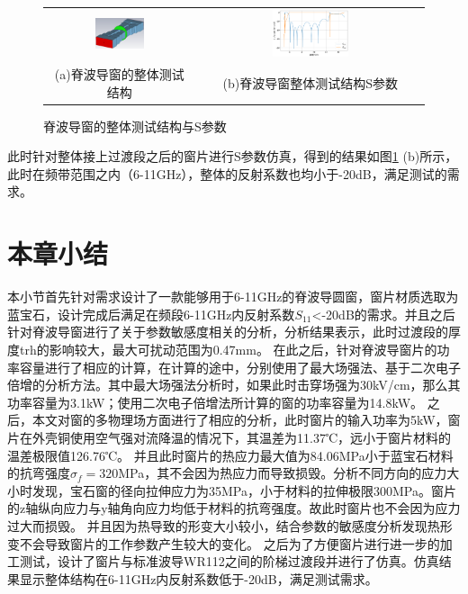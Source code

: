 \documentclass[master]{thesis-uestc}
\begin{document}
\begin{figure}[!htb]
    \small
    \centering
    \begin{tabular}{@{\ }c@{\ }c}
        \includegraphics[width=0.35\textwidth]{pic/chapter3/脊波导窗整体测试结构.png} & 
        \hspace{5pt}
        \includegraphics[width=0.35\textwidth]{pic/chapter3/脊波导窗整体S参数.png}     \\
        \mbox{\small (a)脊波导窗的整体测试结构}                                                                               & 
        \mbox{\small (b)脊波导窗整体测试结构S参数}                                                                                  \\
    \end{tabular}
    \caption{脊波导窗的整体测试结构与S参数}
    \label{fig:脊波导窗的整体测试结构与S参数}
\end{figure}

此时针对整体接上过渡段之后的窗片进行S参数仿真，得到的结果如图\ref{fig:脊波导窗的整体测试结构与S参数} (b)所示，此时在频带范围之内（6-11GHz），整体的反射系数也均小于-20dB，满足测试的需求。


\section{本章小结}
本小节首先针对需求设计了一款能够用于6-11GHz的脊波导圆窗，窗片材质选取为蓝宝石，设计完成后满足在频段6-11GHz内反射系数\(S_{11}\)<-20dB的需求。并且之后针对脊波导窗进行了关于参数敏感度相关的分析，分析结果表示，此时过渡段的厚度trh的影响较大，最大可扰动范围为0.47mm。
在此之后，针对脊波导窗片的功率容量进行了相应的计算，在计算的途中，分别使用了最大场强法、基于二次电子倍增的分析方法。其中最大场强法分析时，如果此时击穿场强为30kV/cm，那么其功率容量为3.1kW；使用二次电子倍增法所计算的窗的功率容量为14.8kW。
之后，本文对窗的多物理场方面进行了相应的分析，此时窗片的输入功率为5kW，窗片在外壳铜使用空气强对流降温的情况下，其温差为11.37℃，远小于窗片材料的温差极限值126.76℃。
并且此时窗片的热应力最大值为84.06MPa小于蓝宝石材料的抗弯强度\(\sigma_f = 320\)MPa，其不会因为热应力而导致损毁。分析不同方向的应力大小时发现，宝石窗的径向拉伸应力为35MPa，小于材料的拉伸极限300MPa。窗片的z轴纵向应力与y轴角向应力均低于材料的抗弯强度。故此时窗片也不会因为应力过大而损毁。
并且因为热导致的形变大小较小，结合参数的敏感度分析发现热形变不会导致窗片的工作参数产生较大的变化。
之后为了方便窗片进行进一步的加工测试，设计了窗片与标准波导WR112之间的阶梯过渡段并进行了仿真。仿真结果显示整体结构在6-11GHz内反射系数低于-20dB，满足测试需求。
\end{document}
